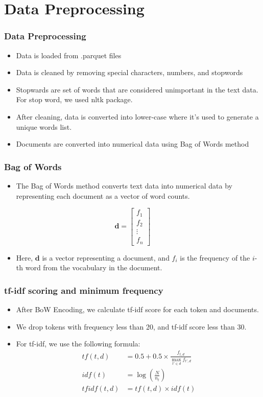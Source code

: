 \documentclass[
    10pt %
    16:9, %
]{beamer}
\begin{document}
\section{Data Preprocessing}
\frame
{
  \frametitle{Data Preprocessing}
  \begin{itemize}
    \item Data is loaded from .parquet files
    \item Data is cleaned by removing special characters, numbers, and stopwords
    \item Stopwards are set of words that are considered unimportant in the text data. For stop word, we used nltk package.
    \item After cleaning, data is converted into lower-case where it's used to generate a unique words list.
    \item Documents are converted into numerical data using Bag of Words method
  \end{itemize}
}

\begin{frame}
  \frametitle{Bag of Words}
  \begin{itemize}
    \item The Bag of Words method converts text data into numerical data by representing each document as a vector of word counts.
  \end{itemize}
  \[
    \mathbf{d} = \begin{bmatrix}
    f_1 \\
    f_2 \\
    \vdots \\
    f_n
  \end{bmatrix}
  \]
  \begin{itemize}
    \item Here, \(\mathbf{d}\) is a vector representing a document, and \(f_i\) is the frequency of the \(i\)-th word from the vocabulary in the document.
  \end{itemize}
\end{frame}

\begin{frame}
  \frametitle{tf-idf scoring and minimum frequency}
  \begin{itemize}
    \item After BoW Encoding, we calculate tf-idf score for each token and documents.
    \item We drop tokens with frequency less than 20, and tf-idf score less than 30.
    \item For tf-idf, we use the following formula:
    \begin{align}
      tf(t,d) &= 0.5 + 0.5 \times \frac{f_{t,d}}{\max_{t' \in d} f_{t',d}} \\
      idf(t) &= \log\left(\frac{N}{n_t}\right) \\
      tfidf(t,d) &= tf(t,d) \times idf(t)
    \end{align}
  \end{itemize}
\end{frame}
\end{document}
